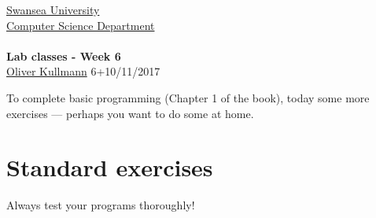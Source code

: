 \documentclass[11pt]{article}
\newcommand{\Java}{\lstset{language=Java,keywordstyle=\bfseries,breaklines,breakindent=30pt}}
\begin{document}
\begin{center}
  \href{http://www.swan.ac.uk/}{Swansea University}\\
  \href{http://www.swan.ac.uk/compsci/}{Computer Science Department}\\[1ex]
  \href{\chp}{\module}\\[1ex]
  \textbf{Lab classes - Week 6}\\
  \href{http://cs.swan.ac.uk/~csoliver}{Oliver Kullmann} 6+10/11/2017
\end{center}


To complete basic programming (Chapter 1 of the book), today some more exercises --- perhaps you want to do some at home.


\section{Standard exercises}
\label{sec:stdex}

\Java

Always test your programs thoroughly!
\end{document}

